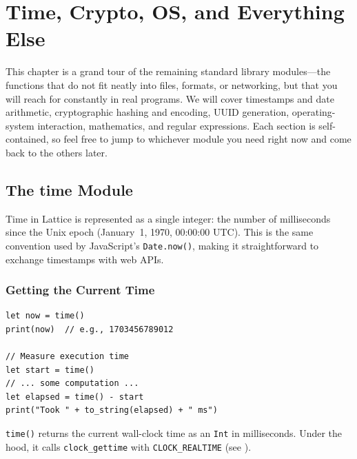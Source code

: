 \chapter{Time, Crypto, OS, and Everything Else}\label{ch:time-crypto-os}


This chapter is a grand tour of the remaining standard library modules---the
functions that do not fit neatly into files, formats, or networking, but that
you will reach for constantly in real programs. We will cover timestamps and
date arithmetic, cryptographic hashing and encoding, UUID generation,
operating-system interaction, mathematics, and regular expressions. Each
section is self-contained, so feel free to jump to whichever module you need
right now and come back to the others later.

\section{The time Module}\label{sec:time-module}


Time in Lattice is represented as a single integer: the number of
milliseconds since the Unix epoch (January~1, 1970, 00:00:00 UTC). This is
the same convention used by JavaScript's \texttt{Date.now()}, making it
straightforward to exchange timestamps with web APIs.

\subsection{Getting the Current Time}\label{sec:time-now}

\begin{lstlisting}[language=Lattice, caption={Getting the current timestamp}]
let now = time()
print(now)  // e.g., 1703456789012

// Measure execution time
let start = time()
// ... some computation ...
let elapsed = time() - start
print("Took " + to_string(elapsed) + " ms")
\end{lstlisting}

\lstinline|time()| returns the current wall-clock time as an \lstinline|Int|
in milliseconds. Under the hood, it calls \texttt{clock\_gettime} with
\texttt{CLOCK\_REALTIME} (see ).

